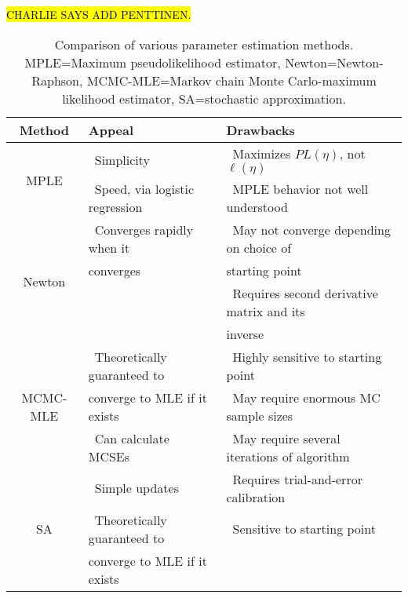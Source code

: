 \hl{CHARLIE SAYS ADD PENTTINEN.}  \citep{Penttinen:1984}

\begin{table}[h] 
\caption[Comparison of various parameter estimation methods]{Comparison of various parameter estimation methods. MPLE=Maximum pseudolikelihood estimator, Newton=Newton-Raphson,
MCMC-MLE=Markov chain Monte Carlo-maximum likelihood estimator, SA=stochastic approximation.}
\begin{tabular}{|c|l|l|}
\hline 
Method & Appeal & Drawbacks \\ [1ex]
\hline
\multirow{2}{0.5in}{MPLE}		
& 	\textbullet \, Simplicity 				  	& \textbullet \, Maximizes $PL(\eta)$, not $\ell(\eta)$  \\
& 	\textbullet \, Speed, via logistic regression 	& \textbullet \, MPLE behavior not well understood \\ [1ex]
\hline
\multirow{4}{0.5in}{Newton}
& 	\textbullet \, Converges rapidly when it   	& \textbullet \, May not converge depending on choice of\\ 
& 	converges 	& starting point \\				
&				& \textbullet \, Requires second derivative matrix and its\\
&				& inverse \\[1ex]
\hline
\multirow{3}{0.5in}{MCMC-MLE}
& 	\textbullet \, Theoretically guaranteed to   	& \textbullet \, Highly sensitive to starting point \\ 
& 	converge to MLE if it exists 					& \textbullet \, May require enormous MC sample sizes\\ 
&	\textbullet \, Can calculate MCSEs			& \textbullet \, May require several iterations of algorithm\\ [1ex]
\hline
\multirow{3}{0.5in}{SA} 		
& 	\textbullet \, Simple updates 				& \textbullet \, Requires trial-and-error calibration  \\			& 	\textbullet \, Theoretically guaranteed to		& \textbullet \, Sensitive to starting point \\
& 	converge to MLE if it exists & \\[1ex]
\hline 
\end{tabular} 
\label{T:Compare estimation}
\end{table}



